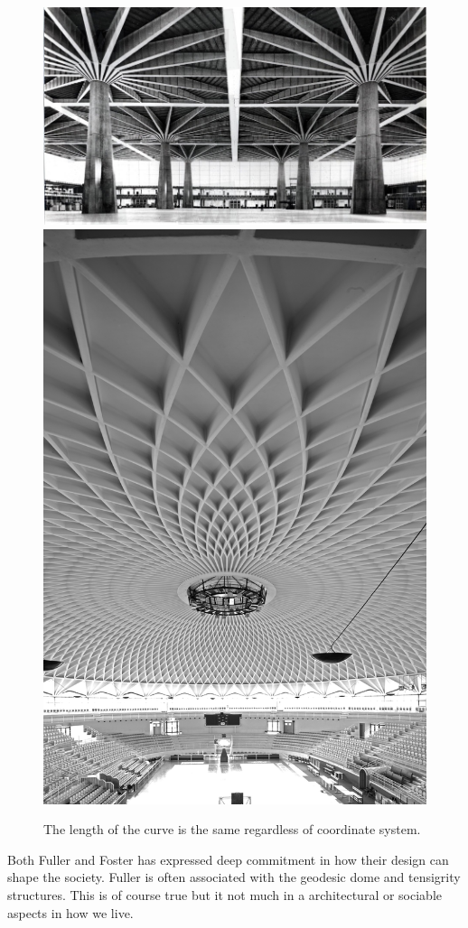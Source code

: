 \begin{figure}[H]
\centering
\includegraphics[height=0.4\linewidth ]{figure/Introduction/Nervi3.jpg}
\includegraphics[height=0.4\linewidth ]{figure/Introduction/nervi4.jpg}
\caption{The length of the curve is the same regardless of coordinate system.}
\end{figure}


Both Fuller and Foster has expressed deep commitment in how their design can shape the society. Fuller is often associated with the geodesic dome and tensigrity structures. This is of course true but it not much in a architectural or sociable aspects in how we live.


